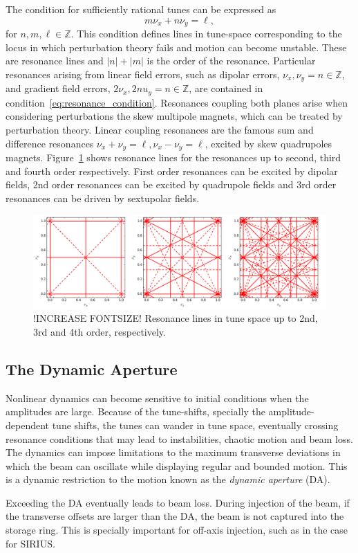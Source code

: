 The condition for sufficiently rational tunes can be expressed as
\begin{equation}
        m\nu_x + n\nu_y = \ell,
        \label{eq:resonance_condition}
\end{equation}
    for $n, m, \ell\in\mathbb{Z}$. This condition defines lines in tune-space corresponding to the locus in which perturbation theory fails and motion can become unstable. These are resonance lines and $|n|+|m|$ is the order of the resonance. Particular resonances arising from linear field errors, such as dipolar errors, $\nu_x, \nu_y = n\in\mathbb{Z}$, and gradient field errors, $2\nu_x, 2nu_y = n\in\mathbb{Z}$, are contained in condition~\eqref{eq:resonance_condition}. Resonances coupling both planes arise when considering perturbations the skew multipole magnets, which can be treated by perturbation theory. Linear coupling resonances are the famous sum and difference resonances $\nu_x + \nu_y = \ell, \nu_x - \nu_y = \ell$, excited by skew quadrupoles magnets.
    Figure~\ref{resons} shows resonance lines for the resonances up to second, third and fourth order respectively. First order resonances can be excited by dipolar fields, 2nd order resonances can be excited by quadrupole fields and 3rd order resonances can be driven by sextupolar fields.
\begin{figure}[thb]
    \centering
    \includegraphics[width=\textwidth]{Images/tunes.png}
    \caption[Resonance lines in tune space up to 2nd, 3rd and 4th order.]{!INCREASE FONTSIZE! Resonance lines in tune space up to 2nd, 3rd and 4th order, respectively.}
    \label{resons}
\end{figure}
\subsection{The Dynamic Aperture}
    Nonlinear dynamics can become sensitive to initial conditions when the amplitudes are large. Because of the tune-shifts, specially the amplitude-dependent tune shifts, the tunes can wander in tune space, eventually crossing resonance conditions that may lead to instabilities, chaotic motion and beam loss. The dynamics can impose limitations to the maximum transverse deviations in which the beam can oscillate while displaying regular and bounded motion. This is a dynamic restriction to the motion known as the \textit{dynamic aperture} (\acrshort*{DA}).

    Exceeding the \gls*{DA} eventually leads to beam loss. During injection of the beam, if the transverse offsets are larger than the \gls*{DA}, the beam is not captured into the storage ring. This is specially important for off-axis injection, such as in the case for SIRIUS.

